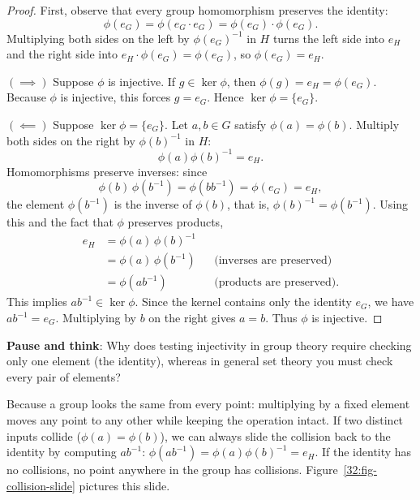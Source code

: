 \begin{proof}
First, observe that every group homomorphism preserves the identity:
\[
\phi(e_G) = \phi(e_G \cdot e_G) = \phi(e_G) \cdot \phi(e_G).
\]
Multiplying both sides on the left by $\phi(e_G)^{-1}$ in $H$ turns the left side into $e_H$ and the right side into $e_H \cdot \phi(e_G) = \phi(e_G)$, so $\phi(e_G) = e_H$.

$(\implies)$ Suppose $\phi$ is injective. If $g \in \ker\phi$, then $\phi(g) = e_H = \phi(e_G)$. Because $\phi$ is injective, this forces $g = e_G$. Hence $\ker\phi = \{e_G\}$.

$(\impliedby)$ Suppose $\ker\phi = \{e_G\}$. Let $a, b \in G$ satisfy $\phi(a) = \phi(b)$. Multiply both sides on the right by $\phi(b)^{-1}$ in $H$:
\[
\phi(a)\phi(b)^{-1} = e_H.
\]
Homomorphisms preserve inverses: since
\[
\phi(b)\,\phi(b^{-1}) = \phi(b b^{-1}) = \phi(e_G) = e_H,
\]
the element $\phi(b^{-1})$ is the inverse of $\phi(b)$, that is, $\phi(b)^{-1} = \phi(b^{-1})$. Using this and the fact that $\phi$ preserves products,
\begin{align*}
e_H &= \phi(a)\,\phi(b)^{-1} \\
    &= \phi(a)\,\phi(b^{-1}) && \text{(inverses are preserved)} \\
    &= \phi(ab^{-1}) && \text{(products are preserved).}
\end{align*}
This implies $ab^{-1} \in \ker\phi$. Since the kernel contains only the identity $e_G$, we have $ab^{-1} = e_G$. Multiplying by $b$ on the right gives $a = b$. Thus $\phi$ is injective.
\end{proof}

\begin{recoverybox}
\textbf{Pause and think}: Why does testing injectivity in group theory require checking only one element (the identity), whereas in general set theory you must check every pair of elements?

Because a group looks the same from every point: multiplying by a fixed element moves any point to any other while keeping the operation intact. If two distinct inputs collide ($\phi(a) = \phi(b)$), we can always slide the collision back to the identity by computing $ab^{-1}$: $\phi(ab^{-1}) = \phi(a)\phi(b)^{-1} = e_H$. If the identity has no collisions, no point anywhere in the group has collisions. Figure~\ref{32:fig-collision-slide} pictures this slide.
\end{recoverybox}

